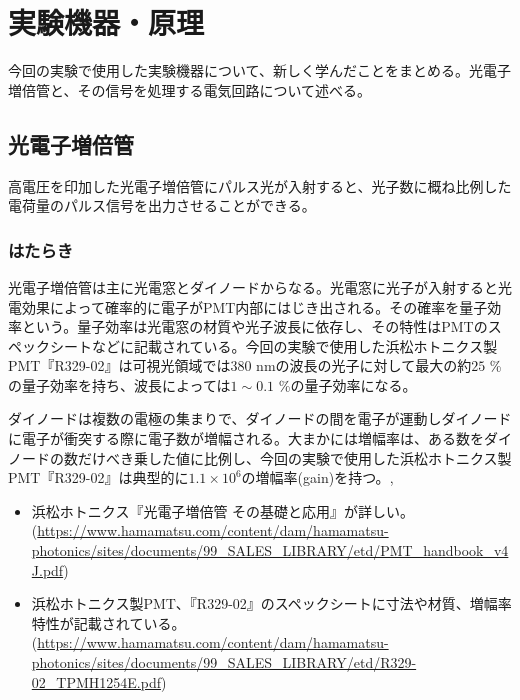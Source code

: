 \documentclass[../../main.tex]{subfiles}
\numberwithin{equation}{section}
\numberwithin{table}{section}
\numberwithin{figure}{section}
\begin{document}
\section{実験機器・原理}
  今回の実験で使用した実験機器について、新しく学んだことをまとめる。光電子増倍管と、その信号を処理する電気回路について述べる。
	\subsection{光電子増倍管}
    高電圧を印加した光電子増倍管にパルス光が入射すると、光子数に概ね比例した電荷量のパルス信号を出力させることができる。
    \subsubsection{はたらき}
      光電子増倍管は主に光電窓とダイノードからなる。光電窓に光子が入射すると光電効果によって確率的に電子がPMT内部にはじき出される。その確率を量子効率という。量子効率は光電窓の材質や光子波長に依存し、その特性はPMTのスペックシートなどに記載されている。今回の実験で使用した浜松ホトニクス製PMT『R329-02』は可視光領域では$380$ nmの波長の光子に対して最大の約$25$ \%の量子効率を持ち、波長によっては$1\sim0.1$ \%の量子効率になる。
      
      ダイノードは複数の電極の集まりで、ダイノードの間を電子が運動しダイノードに電子が衝突する際に電子数が増幅される。大まかには増幅率は、ある数をダイノードの数だけべき乗した値に比例し、今回の実験で使用した浜松ホトニクス製PMT『R329-02』は典型的に$1.1\times10^6$の増幅率(gain)を持つ。\cite{Hamamatsu:r32902},\cite{Hamamatsu:pmt}
      \begin{itemize}
        \item 浜松ホトニクス『光電子増倍管 その基礎と応用』が詳しい。(\url{https://www.hamamatsu.com/content/dam/hamamatsu-photonics/sites/documents/99_SALES_LIBRARY/etd/PMT_handbook_v4J.pdf})
        \item 浜松ホトニクス製PMT、『R329-02』のスペックシートに寸法や材質、増幅率特性が記載されている。(\url{https://www.hamamatsu.com/content/dam/hamamatsu-photonics/sites/documents/99_SALES_LIBRARY/etd/R329-02_TPMH1254E.pdf})
      \end{itemize}
\end{document}
